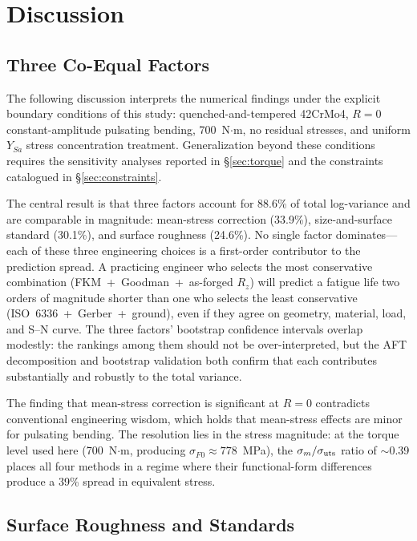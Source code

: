 \documentclass[12pt,a4paper]{article}
\begin{document}
\section{Discussion}
\label{sec:discussion}

\subsection{Three Co-Equal Factors}

The following discussion interprets the numerical findings under the
explicit boundary conditions of this study: quenched-and-tempered
42CrMo4, $R=0$ constant-amplitude pulsating bending, 700~N$\cdot$m,
no residual stresses, and uniform $Y_{Sa}$ stress concentration
treatment. Generalization beyond these conditions requires the
sensitivity analyses reported in \S\ref{sec:torque} and the
constraints catalogued in \S\ref{sec:constraints}.

The central result is that three factors account for 88.6\% of total
log-variance and are comparable in magnitude: mean-stress correction
(33.9\%), size-and-surface standard (30.1\%), and surface roughness
(24.6\%). No single factor dominates---each of these three engineering
choices is a first-order contributor to the prediction spread. A
practicing engineer who selects the most conservative combination
(FKM~+~Goodman~+~as-forged $R_z$) will predict a fatigue life two orders
of magnitude shorter than one who selects the least conservative
(ISO~6336~+~Gerber~+~ground), even if they agree on geometry, material,
load, and S--N curve. The three factors' bootstrap confidence intervals
overlap modestly: the rankings among them should not be over-interpreted,
but the AFT decomposition and bootstrap validation both confirm that each
contributes substantially and robustly to the total variance.

The finding that mean-stress correction is significant at $R=0$
contradicts conventional engineering wisdom, which holds that
mean-stress effects are minor for pulsating bending. The resolution lies
in the stress magnitude: at the torque level used here (700~N$\cdot$m,
producing $\sigma_{F0} \approx 778$~MPa), the $\sigma_m/\sigma_{\rm uts}$
ratio of $\sim$0.39 places all four methods in a regime where their
functional-form differences produce a 39\% spread in equivalent stress.

\subsection{Surface Roughness and Standards}
\end{document}

